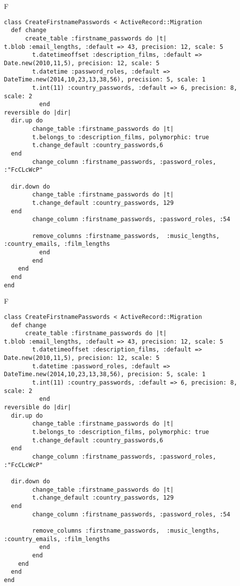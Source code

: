 F
\begin{verbatim}
class CreateFirstnamePasswords < ActiveRecord::Migration
  def change
	  create_table :firstname_passwords do |t|
t.blob :email_lengths, :default => 43, precision: 12, scale: 5
		t.datetimeoffset :description_films, :default => Date.new(2010,11,5), precision: 12, scale: 5
		t.datetime :password_roles, :default => DateTime.new(2014,10,23,13,38,56), precision: 5, scale: 1
		t.int(11) :country_passwords, :default => 6, precision: 8, scale: 2
		  end
reversible do |dir|
  dir.up do
		change_table :firstname_passwords do |t|
		t.belongs_to :description_films, polymorphic: true
 		t.change_default :country_passwords,6
  end
 		change_column :firstname_passwords, :password_roles, :"FcCLcWcP"
   
  dir.down do
		change_table :firstname_passwords do |t|
		t.change_default :country_passwords, 129
  end
 		change_column :firstname_passwords, :password_roles, :54
   
		remove_columns :firstname_passwords,  :music_lengths, :country_emails, :film_lengths 
	      end
	    end
    end 
  end
end

\end{verbatim}

F
\begin{verbatim}
class CreateFirstnamePasswords < ActiveRecord::Migration
  def change
	  create_table :firstname_passwords do |t|
t.blob :email_lengths, :default => 43, precision: 12, scale: 5
		t.datetimeoffset :description_films, :default => Date.new(2010,11,5), precision: 12, scale: 5
		t.datetime :password_roles, :default => DateTime.new(2014,10,23,13,38,56), precision: 5, scale: 1
		t.int(11) :country_passwords, :default => 6, precision: 8, scale: 2
		  end
reversible do |dir|
  dir.up do
		change_table :firstname_passwords do |t|
		t.belongs_to :description_films, polymorphic: true
 		t.change_default :country_passwords,6
  end
 		change_column :firstname_passwords, :password_roles, :"FcCLcWcP"
   
  dir.down do
		change_table :firstname_passwords do |t|
		t.change_default :country_passwords, 129
  end
 		change_column :firstname_passwords, :password_roles, :54
   
		remove_columns :firstname_passwords,  :music_lengths, :country_emails, :film_lengths 
	      end
	    end
    end 
  end
end

\end{verbatim}

